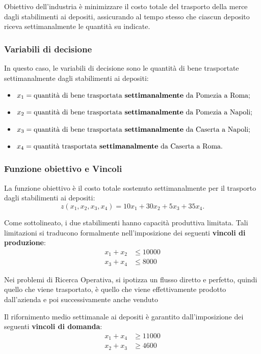 Obiettivo dell'industria è minimizzare il costo totale del trasporto della merce dagli stabilimenti ai depositi, assicurando al tempo stesso che ciascun deposito riceva settimanalmente le quantità su indicate.

\subsubsection*{Variabili di decisione}
In questo caso, le variabili di decisione sono le quantità di bene trasportate settimanalmente dagli stabilimenti ai depositi:
\begin{itemize}
    \item $x_1 = \text{quantità di bene trasportata \textbf{settimanalmente} da Pomezia a Roma;}$
    \item $x_2 = \text{quantità di bene trasportata \textbf{settimanalmente} da Pomezia a Napoli;}$
    \item $x_3 = \text{quantità di bene trasportata \textbf{settimanalmente} da Caserta a Napoli;}$
    \item $x_4 = \text{quantità trasportata \textbf{settimanalmente} da Caserta a Roma.}$
\end{itemize}

\subsubsection*{Funzione obiettivo e Vincoli}
La funzione obiettivo è il costo totale sostenuto settimanalmente per il trasporto dagli stabilimenti ai depositi:
\[
z(x_1, x_2, x_3, x_4) = 10x_1 + 30x_2 + 5x_3 + 35x_4.
\]

Come sottolineato, i due stabilimenti hanno capacità produttiva limitata. Tali limitazioni si traducono formalmente nell'imposizione dei seguenti \textbf{vincoli di produzione}:
\begin{align*}
x_1 + x_2 &\le 10000 \\
x_3 + x_4 &\le 8000
\end{align*}

Nei problemi di Ricerca Operativa, si ipotizza un flusso diretto e perfetto, quindi quello che viene trasportato, è quello che viene effettivamente prodotto dall'azienda
e poi successivamente anche venduto

Il rifornimento medio settimanale ai depositi è garantito dall'imposizione dei seguenti \textbf{vincoli di domanda}:
\begin{align*}
x_1 + x_4 &\ge 11000 \\
x_2 + x_3 &\ge 4600
\end{align*}

